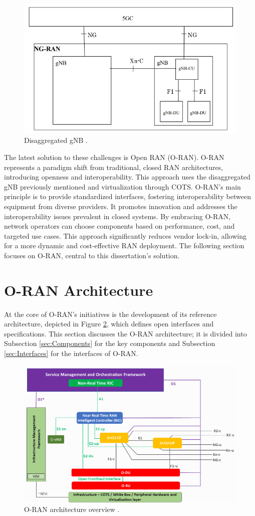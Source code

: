 \begin{figure}[H]
    \centering
    \includegraphics[width=0.6\linewidth]{figures/gnb_diss.png}
    \caption[Disaggregated gNB]{Disaggregated gNB \cite{gnb_diss}.}
    \label{fig:gnbdiss}
\end{figure}

The latest solution to these challenges is Open RAN (O-RAN). O-RAN represents a paradigm shift from traditional, closed RAN architectures, introducing openness and interoperability. This approach uses the disaggregated gNB previously mentioned and virtualization through COTS. O-RAN's main principle is to provide standardized interfaces, fostering interoperability between equipment from diverse providers. It promotes innovation and addresses the interoperability issues prevalent in closed systems. By embracing O-RAN, network operators can choose components based on performance, cost, and targeted use cases. This approach significantly reduces vendor lock-in, allowing for a more dynamic and cost-effective RAN deployment. The following section focuses on O-RAN, central to this dissertation's solution. 


\section{O-RAN Architecture}\label{sec:ORAN}
At the core of O-RAN's initiatives is the development of its reference architecture, depicted in Figure \ref{fig:ORAN}, which defines open interfaces and specifications. This section discusses the O-RAN architecture; it is divided into   Subsection \ref{sec:Components} for the key components and Subsection \ref{sec:Interfaces} for the interfaces of O-RAN. 
 
\begin{figure}[H]
    \centering
    \includegraphics[width=0.6\linewidth]{figures/ORAN.png}
    \caption[O-RAN architecture overview]{O-RAN architecture overview \cite{ORAN-ARCH}.}
    \label{fig:ORAN}
\end{figure}


